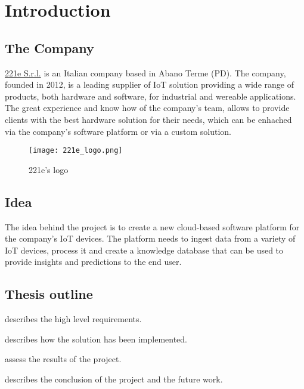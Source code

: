 \chapter{Introduction}
\label{cap:introduction}

\section{The Company}
\href{https://www.221e.com/about-us}{221e S.r.l.} is an Italian company based in Abano Terme (PD). 
The company, founded in 2012, is a leading supplier of IoT solution providing  a wide range of products,
both hardware and software, for industrial and wereable applications.
The great experience and know how of the company's team, allows to provide clients with the best hardware solution
for their needs, which can be enhached via the company's software platform or via a custom solution.
\begin{figure}[htbp]
    \centering
    \texttt{[image: 221e\_logo.png]}
    \caption{221e's logo}
\end{figure}

\section{Idea}

The idea behind the project is to create a new cloud-based software platform for the company's IoT devices.
The platform needs to ingest data from a variety of IoT devices, process it and create a knowledge database that can be used to
provide insights and predictions to the end user.

\section{Thesis outline}

\begin{description}
    \item[{\hyperref[cap:requirements]{The second chapter}}] describes the high level requirements.
    \item 
    \item[{\hyperref[cap:method]{The fourth chapter}}] describes how the solution has been implemented.
    \item[{\hyperref[cap:results]{The fifth chapter}}] assess the results of the project.
    \item[{\hyperref[cap:conclusion]{The last chapter}}] describes the conclusion of the project and the future work.
\end{description}
